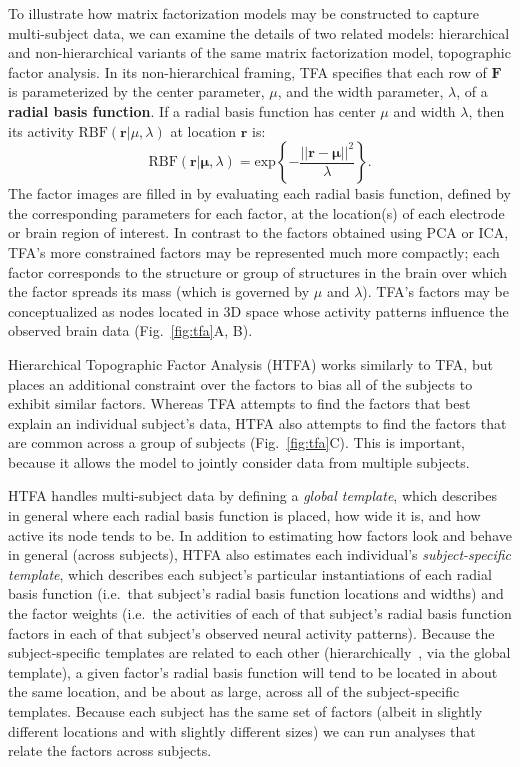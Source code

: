 \documentclass{llmxive}
\begin{document}
To illustrate how matrix factorization models may be constructed to
capture multi-subject data, we can examine the details of two related
models: hierarchical and non-hierarchical variants of the same matrix
factorization model, topographic factor analysis.  In its
non-hierarchical framing, TFA specifies that each row of $\mathbf{F}$
is parameterized by the center parameter, $\mu$, and the width
parameter, $\lambda$, of a \textbf{radial basis function}.  If a
radial basis function has center $\mu$ and width $\lambda$, then its
activity $\mathrm{RBF}(\mathbf{r}|\mu,\lambda)$ at location
$\mathbf{r}$ is:
\[
  \mathrm{RBF}(\mathbf{r}|\mathbf{\mu},\lambda) =
  \mathrm{exp}\left\{ -\frac{||\mathbf{r} -
   \mathbf{\mu}||^2}{\lambda} \right\}.
\]
The factor images are filled in by evaluating each radial basis
function, defined by the corresponding parameters for each factor, at
the location(s) of each electrode or brain region of interest.  In
contrast to the factors obtained using PCA or ICA, TFA's more
constrained factors may be represented much more compactly; each
factor corresponds to the structure or group of structures in the
brain over which the factor spreads its mass (which is governed by
$\mu$ and $\lambda$).  TFA's factors may be conceptualized as nodes
located in 3D space whose activity patterns influence the observed
brain data (Fig.~\ref{fig:tfa}A, B).

Hierarchical Topographic Factor Analysis (HTFA) works similarly to
TFA, but places an additional constraint over the factors to bias all
of the subjects to exhibit similar factors.  Whereas TFA attempts to
find the factors that best explain an individual subject's data, HTFA
also attempts to find the factors that are common across a group of
subjects (Fig.~\ref{fig:tfa}C).  This is important, because it allows
the model to jointly consider data from multiple subjects.

HTFA handles multi-subject data by defining a \textit{global
  template}, which describes in general where each radial basis
function is placed, how wide it is, and how active its node tends to
be.  In addition to estimating how factors look and behave in general
(across subjects), HTFA also estimates each individual's
\textit{subject-specific template}, which describes each subject's
particular instantiations of each radial basis function (i.e.\ that
subject's radial basis function locations and widths) and the factor
weights (i.e.\ the activities of each of that subject's radial basis
function factors in each of that subject's observed neural activity
patterns).  Because the subject-specific templates are related to each
other (hierarchically~\cite{GelmHill07}, via the global template), a
given factor's radial basis function will tend to be located in about
the same location, and be about as large, across all of the
subject-specific templates.  Because each subject has the same set of
factors (albeit in slightly different locations and with slightly
different sizes) we can run analyses that relate the factors across
subjects.
\end{document}
